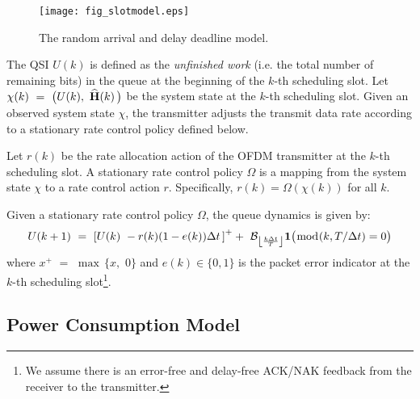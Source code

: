 \documentclass[11pt,journal, onecolumn]{./IEEEtran}
\begin{document}
\begin{figure}[t!]
\centering
\texttt{[image: fig\_slotmodel.eps]}
\caption{The random arrival and delay deadline model.} \label{fig_slotmodel}
\end{figure}



The QSI $U(k)$ is defined as the {\em unfinished work} (i.e. the total number of remaining bits) in the queue at the beginning of the $k$-th scheduling slot. Let $\chi (k)\,\, = \,\,\big( {U(k),\,\,\widehat{\bf{H}}(k)\,} \big)$ be the system state at the $k$-th scheduling slot. Given an observed system state $\chi$, the transmitter adjusts the transmit data rate according to a stationary rate control policy defined below.

\begin{Definition}
Let $r(k)$ be the rate allocation action of the OFDM transmitter at the $k$-th scheduling slot. A stationary rate control policy $\Omega$ is a mapping from the system state $\chi$ to a rate control action $r$. Specifically, $r(k) = \Omega(\chi(k))$ for all $k$. ~\hfill\IEEEQED
\end{Definition}


Given a stationary rate control policy $\Omega$, the queue dynamics is given by:
\begin{equation}\label{eq_Ut}
U(k + 1)\,\, = \,\,{\left[ {U(k)\,\, - r(k)(1 - {e(k)})\Delta t\,} \right]^ + } + \,\,{\mathcal B_{\left\lfloor {\frac{{k\Delta t}}{T}} \right\rfloor }}{\bf{1}}\big( {\bmod ( k,T/\Delta t ) = 0} \big)
\end{equation}
where ${x^ + }\,\, = \,\,\max \,\{ x,\,\,0\} $ and $e(k) \in\{0,1\}$ is the packet error indicator at the $k$-th scheduling slot\footnote{We assume there is an error-free and delay-free ACK/NAK feedback from the receiver to the transmitter.}.

\subsection{Power Consumption Model}
\end{document}
